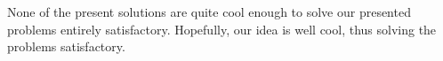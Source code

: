 None of the present solutions are quite cool enough to solve our presented 
problems entirely satisfactory. Hopefully, our idea is well cool, thus solving 
the problems satisfactory.
